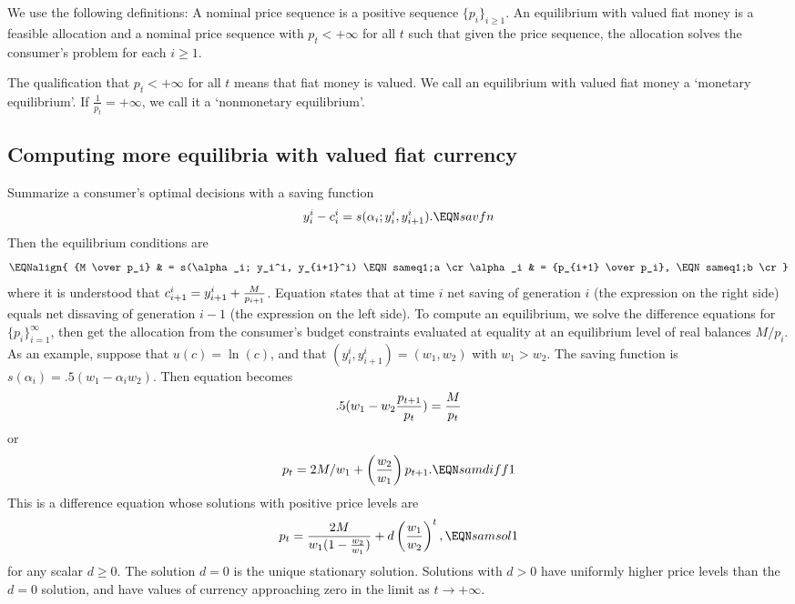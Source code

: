   We use  the following definitions:
\medskip
{}  A nominal price  sequence is a positive
sequence $\{p_i\}_{i \geq 1}$.
\medskip
{}  An equilibrium with valued fiat money
is a feasible allocation and a nominal price sequence with $p_t < +\infty$
for all $t$
 such
that given the price sequence, the allocation solves the consumer's
problem for each $i \geq 1$.
\medskip


\noindent The qualification that $p_t < + \infty$ for all $t$  means that
fiat money is valued. We call an equilibrium with valued fiat money
a `monetary equilibrium'.  If ${\frac{1}{p_t}} = + \infty$, we   call it a `nonmonetary equilibrium'.



\subsection{Computing  more equilibria with valued fiat currency}
   Summarize a  consumer's optimal decisions with
a saving function
$$ y_i^i - c_i^i = s(\alpha_i; y_i^i, y_{i+1}^i). \EQN savfn $$
Then the equilibrium conditions  are
$$ \EQNalign{ {M  \over p_i} & = s(\alpha_i; y_i^i, y_{i+1}^i) \EQN sameq1;a
                          \cr
                \alpha_i & = {p_{i+1} \over p_i}, \EQN sameq1;b \cr }$$
where it is understood that
$ c_{i+1}^i = y_{i+1}^i + {M \over p_{i+1}} $.
Equation  states that at time $i$   net  saving of generation $i$ (the expression on the right side) equals
 net dissaving of generation $i-1$ (the expression on the left side).  To compute an equilibrium, we solve the difference equations
 for $\{p_i\}_{i=1}^\infty$,  then get the allocation
from the consumer's budget constraints evaluated at equality
at an equilibrium level of real balances $M/p_i$.
As an example, suppose that $u(c) = \ln(c)$,
and that $(y^i_i, y^i_{i+1}) = (w_1, w_2)$ with $w_1 > w_2$.
  The saving function is
$ s(\alpha_i) = .5(w_1 - \alpha_i w_2)$.   Then
equation  becomes
$$ .5(w_1 - w_2 {p_{t+1} \over p_t}) = {M \over p_t} $$
or
$$ p_t = 2 M/ w_1 + \left({w_2 \over    w_1}\right) p_{t+1} .\EQN samdiff1 $$
This is a difference equation whose solutions
with positive price levels are
$$ p_t = {2 M \over w_1 (1 - {w_2 \over w_1})} + d
  \left({w_1\over w_2}\right)^t, \EQN samsol1 $$
for any scalar $d \geq 0$.
The solution  $d=0$ is the unique stationary solution.  Solutions
with $d >0$ have uniformly higher price levels than the $d=0$ solution,
and have  values of currency approaching  zero in the limit as $t \rightarrow +\infty$.

